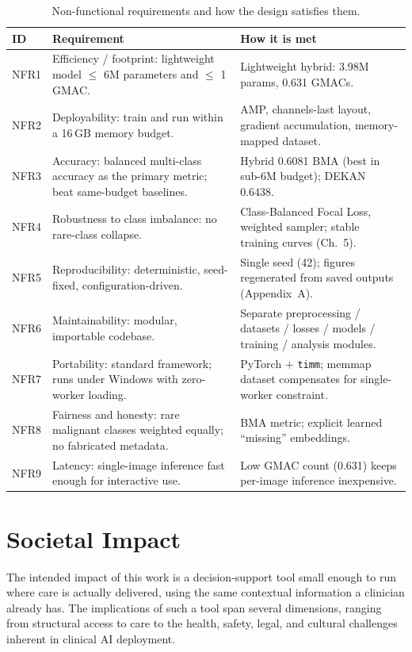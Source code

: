 \begin{table}[H]
\centering
\caption{Non-functional requirements and how the design satisfies them.}
\label{tab:nonfunctional-requirements}
\small
\begin{tabularx}{\textwidth}{>{\raggedright\arraybackslash}p{}>{\raggedright\arraybackslash}X>{\raggedright\arraybackslash}X}
\toprule
ID & Requirement & How it is met \\
\midrule
NFR1 & Efficiency / footprint: lightweight model $\le$ 6M parameters and $\le$ 1 GMAC. & Lightweight hybrid: 3.98M params, 0.631 GMACs. \\
NFR2 & Deployability: train and run within a 16\,GB memory budget. & AMP, channels-last layout, gradient accumulation, memory-mapped dataset. \\
NFR3 & Accuracy: balanced multi-class accuracy as the primary metric; beat same-budget baselines. & Hybrid 0.6081 BMA (best in sub-6M budget); DEKAN 0.6438. \\
NFR4 & Robustness to class imbalance: no rare-class collapse. & Class-Balanced Focal Loss, weighted sampler; stable training curves (Ch.~5). \\
NFR5 & Reproducibility: deterministic, seed-fixed, configuration-driven. & Single seed (42); figures regenerated from saved outputs (Appendix~A). \\
NFR6 & Maintainability: modular, importable codebase. & Separate preprocessing / datasets / losses / models / training / analysis modules. \\
NFR7 & Portability: standard framework; runs under Windows with zero-worker loading. & PyTorch + \texttt{timm}; memmap dataset compensates for single-worker constraint. \\
NFR8 & Fairness and honesty: rare malignant classes weighted equally; no fabricated metadata. & BMA metric; explicit learned ``missing'' embeddings. \\
NFR9 & Latency: single-image inference fast enough for interactive use. & Low GMAC count (0.631) keeps per-image inference inexpensive. \\
\bottomrule
\end{tabularx}
\end{table}


\section{Societal Impact}

The intended impact of this work is a decision-support tool small enough to run where care is actually delivered, using the same contextual information a clinician already has. The implications of such a tool span several dimensions, ranging from structural access to care to the health, safety, legal, and cultural challenges inherent in clinical AI deployment.

